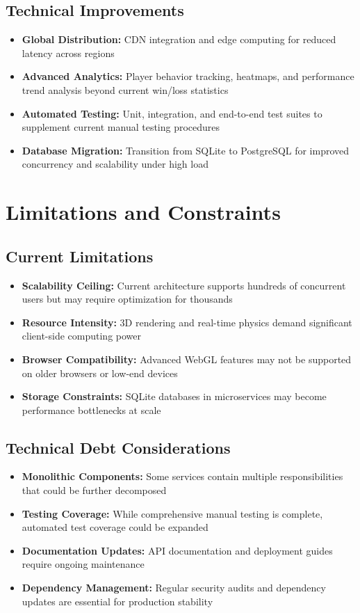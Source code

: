 \documentclass[11pt,a4paper]{report}
\begin{document}
\subsection{Technical Improvements}
\begin{itemize}
  \item \textbf{Global Distribution:} CDN integration and edge computing for reduced latency across regions
  \item \textbf{Advanced Analytics:} Player behavior tracking, heatmaps, and performance trend analysis beyond current win/loss statistics
  \item \textbf{Automated Testing:} Unit, integration, and end-to-end test suites to supplement current manual testing procedures
  \item \textbf{Database Migration:} Transition from SQLite to PostgreSQL for improved concurrency and scalability under high load
\end{itemize}

\section{Limitations and Constraints}
\label{sec:limitations}

\subsection{Current Limitations}
\begin{itemize}
  \item \textbf{Scalability Ceiling:} Current architecture supports hundreds of concurrent users but may require optimization for thousands
  \item \textbf{Resource Intensity:} 3D rendering and real-time physics demand significant client-side computing power
  \item \textbf{Browser Compatibility:} Advanced WebGL features may not be supported on older browsers or low-end devices
  \item \textbf{Storage Constraints:} SQLite databases in microservices may become performance bottlenecks at scale
\end{itemize}

\subsection{Technical Debt Considerations}
\begin{itemize}
  \item \textbf{Monolithic Components:} Some services contain multiple responsibilities that could be further decomposed
  \item \textbf{Testing Coverage:} While comprehensive manual testing is complete, automated test coverage could be expanded
  \item \textbf{Documentation Updates:} API documentation and deployment guides require ongoing maintenance
  \item \textbf{Dependency Management:} Regular security audits and dependency updates are essential for production stability
\end{itemize}
\end{document}
